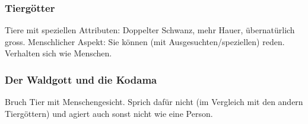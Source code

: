 \subsubsection*{Tiergötter}
Tiere mit speziellen Attributen: Doppelter Schwanz, mehr Hauer, übernatürlich gross. Menschlicher Aspekt: Sie können (mit Ausgesuchten/speziellen) reden. Verhalten sich wie Menschen.

\subsubsection*{Der Waldgott und die Kodama}
Bruch Tier mit Menschengesicht. Sprich dafür nicht (im Vergleich mit den andern Tiergöttern) und agiert auch sonst nicht wie eine Person.